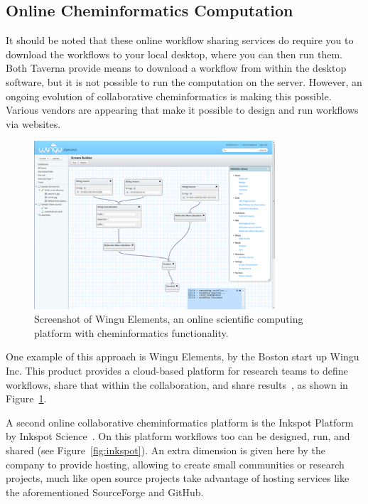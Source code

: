 \documentclass[11pt]{book}
\begin{document}
\subsection{Online Cheminformatics Computation}

It should be noted that these online workflow sharing services do
require you to download the workflows to your local desktop, where
you can then run them. Both Taverna provide means to download a
workflow from within the desktop software, but it is not possible
to run the computation on the server.
However, an ongoing evolution of collaborative cheminformatics
is making this possible. Various vendors are appearing that make
it possible to design and run workflows via websites.

\begin{figure}[bt]
\begin{center}
\includegraphics[width=0.8\textwidth]{graphics/wingu.png}
\end{center}
\caption{Screenshot of Wingu Elements, an online scientific
computing platform with cheminformatics functionality.}
\label{fig:wingu}
\end{figure}

One example of this approach is Wingu Elements, by the Boston start up
Wingu Inc. This product provides a cloud-based platform for research teams
to define workflows, share that within the collaboration, and
share results~\cite{wingu}, as shown in Figure~\ref{fig:wingu}.

A second online collaborative cheminformatics platform is the
Inkspot Platform by Inkspot Science~\cite{inkspot}. On this platform
workflows too can be designed, run, and shared (see
Figure~\ref{fig:inkspot}). An extra dimension
is given here by the company to provide hosting, allowing to create
small communities or research projects, much like open source
projects take advantage of hosting services like the aforementioned
SourceForge and GitHub.
\end{document}
